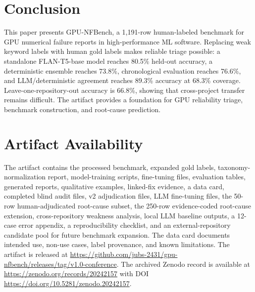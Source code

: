 \documentclass[conference]{IEEEtran}
\newcommand{\bench}{GPU-NFBench}
\begin{document}
\section{Conclusion}

This paper presents \bench{}, a 1,191-row human-labeled benchmark for GPU
numerical failure reports in high-performance ML software. Replacing weak
keyword labels with human gold labels makes reliable triage possible: a
standalone FLAN-T5-base model reaches 80.5\% held-out accuracy, a deterministic
ensemble reaches 73.8\%, chronological evaluation reaches 76.6\%, and
LLM/deterministic agreement reaches 89.3\% accuracy at 68.3\% coverage.
Leave-one-repository-out accuracy is 66.8\%, showing that cross-project
transfer remains difficult. The artifact provides a foundation for GPU
reliability triage, benchmark construction, and root-cause prediction.

\section*{Artifact Availability}

The artifact contains the processed benchmark, expanded gold labels,
taxonomy-normalization report, model-training scripts, fine-tuning files,
evaluation tables, generated reports, qualitative examples, linked-fix evidence,
a data card, completed blind audit files, v2 adjudication files, LLM fine-tuning
files, the 50-row human-adjudicated root-cause subset, the 250-row
evidence-coded root-cause extension, cross-repository weakness analysis, local
LLM baseline outputs, a 12-case error appendix, a reproducibility checklist,
and an external-repository candidate pool for future benchmark expansion. The
data card documents intended use, non-use cases, label provenance, and known
limitations. The artifact is released at
\url{https://github.com/jubs-2431/gpu-nfbench/releases/tag/v1.0-conference}.
The archived Zenodo record is available at
\url{https://zenodo.org/records/20242157} with DOI
\url{https://doi.org/10.5281/zenodo.20242157}.
\end{document}
